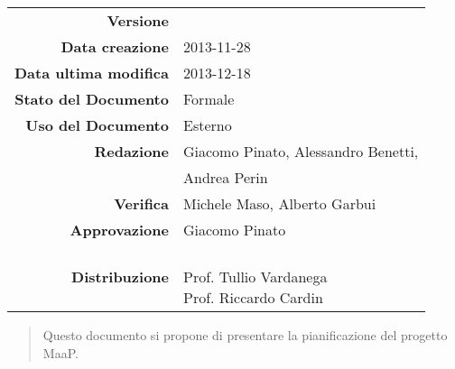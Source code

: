 

\newcommand{\Versione}{\versionePianoDiProgetto{}}	%
\newcommand{\Data}{2013-11-28}						%
\newcommand{\DataUltimaModifica}{2013-12-18}
\newcommand{\TipoDocumento}{Piano di Progetto}		%




\begin{center}
\begin{tabular}{r|l}
\textbf{Versione} & \Versione{} \\
\textbf{Data creazione} & \Data{} \\
\textbf{Data ultima modifica} & \DataUltimaModifica{} \\
\textbf{Stato del Documento} & Formale \\		%
\textbf{Uso del Documento} & Esterno \\			%
\textbf{Redazione} & Giacomo Pinato, Alessandro Benetti,\\			%
				   & Andrea Perin\\
\textbf{Verifica} & Michele Maso, Alberto Garbui\\				%
\textbf{Approvazione} & Giacomo Pinato\\				%
\textbf{Distribuzione} & \parbox[t]{4cm}{\NomeGruppo{} \\ Prof. Tullio Vardanega \\ Prof. Riccardo Cardin \\ \Prop{} }\\
\end{tabular}
\end{center}

\vspace{0.05in}

\begin{abstract}
\begin{center}
Questo documento si propone di presentare la pianificazione del progetto MaaP.
\end{center}
\end{abstract}

